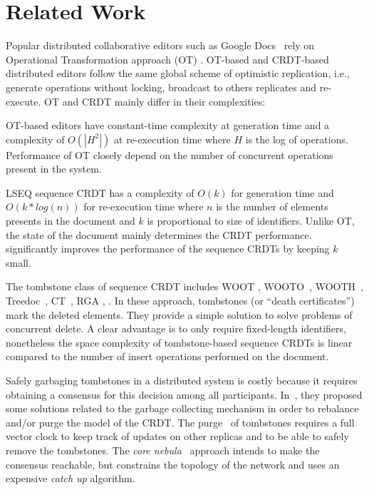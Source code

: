 \section{Related Work}
\label{sec:relatedwork}

Popular distributed collaborative editors such as Google
Docs~\cite{nichols1995high} rely on Operational Transformation approach
(OT) \cite{sun1998operational,sun1998achieving}.  OT-based and CRDT-based
distributed editors follow the same global scheme of optimistic replication,
i.e., generate operations without locking, broadcast to others replicates and
re-execute. OT and CRDT mainly differ in their complexities:
\begin{inparaenum}[(i)]
\item OT-based editors have constant-time complexity at generation time and a
  complexity of $O(|H^{2}|)$ at re-execution time where $H$ is the log of
  operations. Performance of OT closely depend on the number of concurrent
  operations present in the system.
\item LSEQ sequence CRDT has a complexity of $O(k)$ for generation time and
  $O(k*log(n))$ for re-execution time where $n$ is the number of elements
  presents in the document and $k$ is proportional to size of
  identifiers. Unlike OT, the state of the document mainly determines the CRDT
  performance. \NAME{} significantly improves the performance of the sequence
  CRDTs by keeping $k$ small.
\end{inparaenum}

The tombstone class of sequence CRDT includes WOOT \cite{oster2006data},
WOOTO~\cite{weiss2007wooki}, WOOTH~\cite{ahmed2011evaluating},
Treedoc~\cite{preguica2009commutative}, CT~\cite{grishchenko2010deep},
RGA \cite{roh2011replicated}, \cite{Yu2012stringwise}. In these approach,
tombstones (or ``death certificates'') mark the deleted elements. They provide
a simple solution to solve problems of concurrent delete. A clear advantage is
to only require fixed-length identifiers, nonetheless the space complexity of
tombstone-based sequence CRDTs is linear compared to the number of insert
operations performed on the document.

Safely garbaging tombstones in a distributed system is costly because it
requires obtaining a consensus for this decision among all participants.
In~\cite{roh2011replicated, letia2009crdts}, they proposed some solutions
related to the garbage collecting mechanism in order to rebalance and/or purge
the model of the CRDT.  The purge~\cite{roh2011replicated} of tombstones
requires a full vector clock to keep track of updates on other replicas and to
be able to safely remove the tombstones. The \emph{core
  nebula}~\cite{letia2009crdts} approach intends to make the consensus
reachable, but constrains the topology of the network and uses an expensive
\emph{catch up} algorithm.

